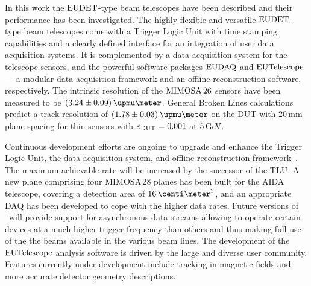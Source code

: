 

In this work the $\textrm{EUDET}$-type beam telescopes have been described and their performance has been investigated. 
The highly flexible and versatile $\textrm{EUDET}$-type beam telescopes come with a Trigger Logic Unit with time stamping capabilities and a clearly defined interface for an integration of user data acquisition systems.
It is complemented by a data acquisition system for the telescope sensors, and the powerful software packages $\textrm{EUDAQ}$ and $\textrm{EUTelescope}$
 ---  a modular data acquisition framework and an offline reconstruction software, respectively. 
The intrinsic resolution of the $\textrm{MIMOSA\,26}$ sensors have been measured to be $(3.24 \pm 0.09)\,\upmu\meter$.
General Broken Lines calculations predict a track resolution of $(1.78 \pm 0.03)\,\upmu\meter$ on the DUT with 20\,mm plane spacing for thin sensors with $\mathnormal{\varepsilon_{\textrm{DUT}}} = 0.001$ at 5\,GeV. 

Continuous development efforts are ongoing to upgrade and enhance the Trigger Logic Unit, the data acquisition system, and offline reconstruction framework~\cite{ref:tipp2014_eudaq}.  
The maximum achievable rate will be increased by the successor of the TLU. 
A new plane comprising four MIMOSA\,28 planes has been built for the AIDA telescope, covering a detection area of $16\,\centi\meter^2$, and an appropriate DAQ has been developed to cope with the higher data rates. 
Future versions of \eudaq\ will provide support for asynchronous data streams allowing to operate certain devices at a much higher trigger frequency than others
 and thus making full use of the the beams available in the various beam lines.
The development of the $\textrm{EUTelescope}$ analysis software is driven by the large and diverse user community. 
Features currently under development include tracking in magnetic fields and more accurate detector geometry descriptions. 
